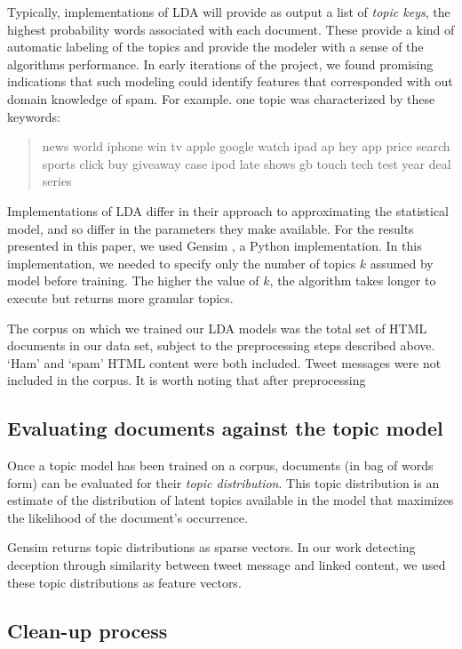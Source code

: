 \documentclass[times, 11pt, twocolumn]{article}
\begin{document}
Typically, implementations of LDA will provide as output a list of \emph{topic keys}, the highest probability words associated with each document.
These provide a kind of automatic labeling of the topics and provide the modeler with a sense of the algorithms performance.
In early iterations of the project, we found promising indications that such modeling could identify features that corresponded with out domain knowledge of spam.
For example. one topic was characterized by these keywords:

\begin{quotation}
news world iphone win tv apple google watch ipad ap hey  app price search sports click buy giveaway case ipod late shows gb touch  tech test year deal series
\end{quotation} 

Implementations of LDA differ in their approach to approximating the statistical model, and so differ in the parameters they make available.
For the results presented in this paper, we used Gensim \cite{rehurek_lrec}, a Python implementation.
In this implementation, we needed to specify only the number of topics $k$ assumed by model before training.
The higher the value of $k$, the algorithm takes longer to execute but returns more granular topics.

The corpus on which we trained our LDA models was the total set of HTML documents in our data set, subject to the preprocessing steps described above.
`Ham' and `spam' HTML content were both included.
Tweet messages were not included in the corpus.
It is worth noting that after preprocessing 

\subsection{Evaluating documents against the topic model}

Once a topic model has been trained on a corpus, documents (in bag of words form) can
be evaluated for their \emph{topic distribution}.
This topic distribution is an estimate of the distribution of latent topics available in the model
that maximizes the likelihood of the document's occurrence.

Gensim returns topic distributions as sparse vectors.  In our work detecting deception through similarity
between tweet message and linked content, we used these topic distributions as feature vectors.

\subsection{Clean-up process}
\end{document}
